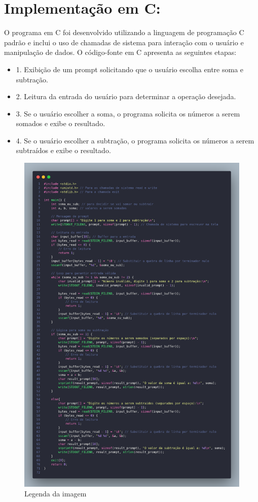 \documentclass[
	12pt,				%
	openright,			%
	oneside,			%
	a4paper,			%
	chapter=TITLE,		%
	english,			%
	french,				%
	spanish,			%
	brazil				%
	]{abntex2}
\theoremstyle{definition}
\begin{document}
\section{Implementação em C:}

O programa em C foi desenvolvido utilizando a linguagem de programação C padrão e inclui o uso 
de chamadas de sistema para interação com o usuário e manipulação de dados. O código-fonte em C 
apresenta as seguintes etapas:

\begin{itemize}
	\item 1. Exibição de um prompt solicitando que o usuário escolha entre soma e subtração.
	\item 2. Leitura da entrada do usuário para determinar a operação desejada.
	\item 3. Se o usuário escolher a soma, o programa solicita os números a serem somados e exibe o resultado.
	\item 4. Se o usuário escolher a subtração, o programa solicita os números a serem subtraídos e exibe o resultado.
\end{itemize}

\begin{figure}
    \centering
    \includegraphics[width=1.0\textwidth]{imagens/code.png}
    \caption{Legenda da imagem}
    \label{fig:exemplo}
\end{figure}
\end{document}
